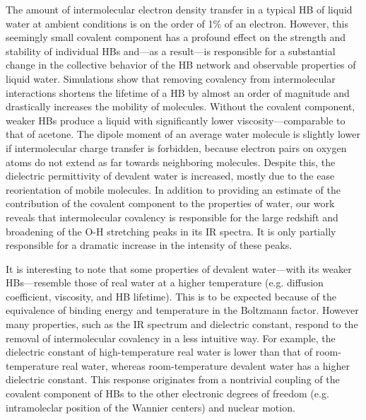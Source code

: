 \documentclass[journal=jacsat,manuscript=article]{achemso}
\begin{document}
The amount of intermolecular electron density transfer in a typical HB of liquid water at ambient conditions is on the order of 1\% of an electron. 
However, this seemingly small covalent component has a profound effect on the strength and stability of individual HBs and---as a result---is responsible for a substantial change in the collective behavior of the HB network and observable properties of liquid water. 
Simulations show that removing covalency from intermolecular interactions shortens the lifetime of a HB by almost an order of magnitude and drastically increases the mobility of molecules. 
Without the covalent component, weaker HBs produce a liquid with significantly lower viscosity---comparable to that of acetone. 
The dipole moment of an average water molecule is slightly lower if intermolecular charge transfer is forbidden, because electron pairs on oxygen atoms do not extend as far towards neighboring molecules. 
Despite this, the dielectric permittivity of devalent water is increased, mostly due to the ease reorientation of mobile molecules. 
In addition to providing an estimate of the contribution of the covalent component to the properties of water, our work reveals that intermolecular covalency is responsible for the large redshift and broadening of the O-H stretching peaks in its IR spectra. It is only partially responsible for a dramatic increase in the intensity of these peaks. 

It is interesting to note that some properties of devalent water---with its weaker HBs---resemble those of real water at a higher temperature (e.g. diffusion coefficient, viscosity, and HB lifetime). 
This is to be expected because of the equivalence of binding energy and temperature in the Boltzmann factor. However many properties, such as the IR spectrum and dielectric constant, respond to the removal of intermolecular covalency in a less intuitive way. 
For example, the dielectric constant of high-temperature real water is lower than that of room-temperature real water, whereas room-temperature devalent water has a higher dielectric constant. 
This response originates from a nontrivial coupling of the covalent component of HBs to the other electronic degrees of freedom (e.g. intramoleclar position of the Wannier centers) and nuclear motion.
\end{document}
